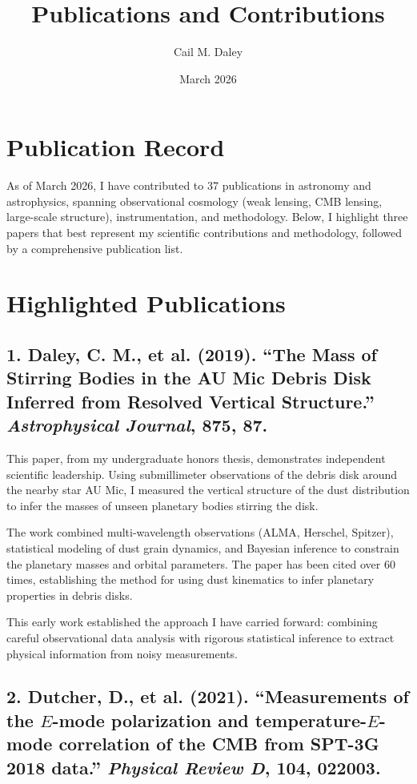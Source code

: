 \documentclass[11pt,a4paper]{article}
\title{Publications and Contributions}
\author{Cail M. Daley}
\date{March 2026}
\begin{document}
\maketitle

\section*{Publication Record}

As of March 2026, I have contributed to 37 publications in astronomy and astrophysics, spanning observational cosmology (weak lensing, CMB lensing, large-scale structure), instrumentation, and methodology. Below, I highlight three papers that best represent my scientific contributions and methodology, followed by a comprehensive publication list.

\section*{Highlighted Publications}

\subsection*{1. Daley, C. M., et al. (2019). ``The Mass of Stirring Bodies in the AU Mic Debris Disk Inferred from Resolved Vertical Structure.'' \textit{Astrophysical Journal}, 875, 87.}

This paper, from my undergraduate honors thesis, demonstrates independent scientific leadership. Using submillimeter observations of the debris disk around the nearby star AU Mic, I measured the vertical structure of the dust distribution to infer the masses of unseen planetary bodies stirring the disk.

The work combined multi-wavelength observations (ALMA, Herschel, Spitzer), statistical modeling of dust grain dynamics, and Bayesian inference to constrain the planetary masses and orbital parameters. The paper has been cited over 60 times, establishing the method for using dust kinematics to infer planetary properties in debris disks.

This early work established the approach I have carried forward: combining careful observational data analysis with rigorous statistical inference to extract physical information from noisy measurements.

\subsection*{2. Dutcher, D., et al. (2021). ``Measurements of the $E$-mode polarization and temperature-$E$-mode correlation of the CMB from SPT-3G 2018 data.'' \textit{Physical Review D}, 104, 022003.}
\end{document}
